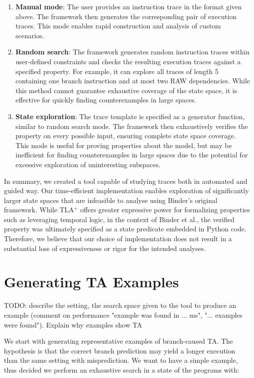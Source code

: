 \begin{enumerate}
	\item \textbf{Manual mode}: The user provides an instruction trace in the format given above. The framework then generates the corresponding pair of execution traces. This mode enables rapid construction and analysis of custom scenarios.
	\item \textbf{Random search}: The framework generates random instruction traces within user-defined constraints and checks the resulting execution traces against a specified property. For example, it can explore all traces of length 5 containing one branch instruction and at most two RAW dependencies. While this method cannot guarantee exhaustive coverage of the state space, it is effective for quickly finding counterexamples in large spaces.
	\item \textbf{State exploration}: The trace template is specified as a generator function, similar to random search mode. The framework then exhaustively verifies the property on every possible input, ensuring complete state space coverage. This mode is useful for proving properties about the model, but may be inefficient for finding counterexamples in large spaces due to the potential for excessive exploration of uninteresting subspaces.
\end{enumerate}


In summary, we created a tool capable of studying traces both in automated and guided way. Our time-efficient implementation enables exploration of significantly larger state spaces that are infeasible to analyse using Binder's original framework. While TLA$^+$ offers greater expressive power for formalizing properties such as leveraging temporal logic, in the context of Binder et al., the verified property was ultimately specified as a state predicate embedded in Python code. Therefore, we believe that our choice of implementation does not result in a substantial loss of expressiveness or rigor for the intended analyses.

\section{Generating TA Examples}

TODO: describe the setting, the search space given to the tool to produce an example (comment on performance "example was found in ... ms", "... examples were found"). Explain why examples show TA

We start with generating representative examples of branch-caused TA. The hypothesis is that the correct branch prediction may yield a longer execution than the same setting with misprediction. We want to have a simple example, thus decided we perform an exhaustive search in a state of the programs with:

